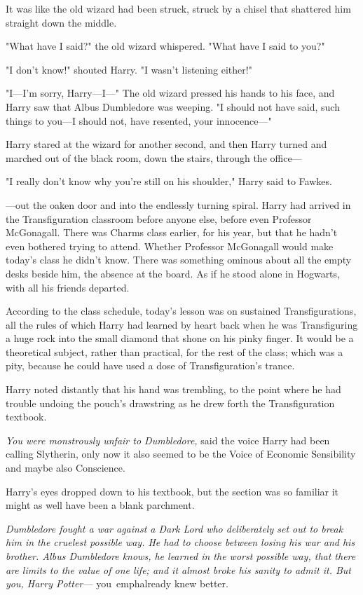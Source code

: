 It was like the old wizard had been struck, struck by a chisel that shattered 
him straight down the middle.

"What have I said?" the old wizard whispered. "What have I said to you?"

"I don't know!" shouted Harry. "I wasn't listening either!"

"I---I'm sorry, Harry---I---" The old wizard pressed his hands to his face, and 
Harry saw that Albus Dumbledore was weeping. "I should not have said, such 
things to you---I should not, have resented, your innocence---"

Harry stared at the wizard for another second, and then Harry turned and 
marched out of the black room, down the stairs, through the office---

"I really don't know why you're still on his shoulder," Harry said to Fawkes.

---out the oaken door and into the endlessly turning spiral.
\sbreak
Harry had arrived in the Transfiguration classroom before anyone else, before 
even Professor McGonagall. There was Charms class earlier, for his year, but 
that he hadn't even bothered trying to attend. Whether Professor McGonagall 
would make today's class he didn't know. There was something ominous about all 
the empty desks beside him, the absence at the board. As if he stood alone in 
Hogwarts, with all his friends departed.

According to the class schedule, today's lesson was on sustained 
Transfigurations, all the rules of which Harry had learned by heart back when 
he was Transfiguring a huge rock into the small diamond that shone on his pinky 
finger. It would be a theoretical subject, rather than practical, for the rest 
of the class; which was a pity, because he could have used a dose of 
Transfiguration's trance.

Harry noted distantly that his hand was trembling, to the point where he had 
trouble undoing the pouch's drawstring as he drew forth the Transfiguration 
textbook.

\emph{You were monstrously unfair to Dumbledore,} said the voice Harry had been 
calling Slytherin, only now it also seemed to be the Voice of Economic 
Sensibility and maybe also Conscience.

Harry's eyes dropped down to his textbook, but the section was so familiar it 
might as well have been a blank parchment.

\emph{Dumbledore fought a war against a Dark Lord who deliberately set out to 
break him in the cruelest possible way. He had to choose between losing his war 
and his brother. Albus Dumbledore knows, he learned in the worst possible way, 
that there are limits to the value of one life; and it almost broke his sanity 
to admit it. But you, Harry Potter---} you\ emph{already knew better.}

